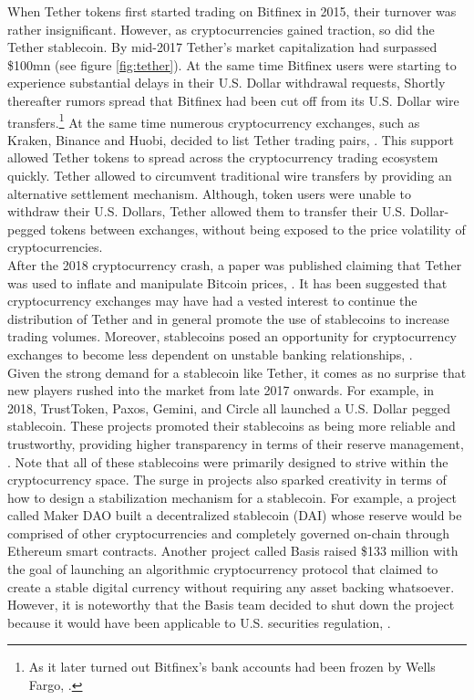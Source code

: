 \documentclass[conference]{IEEEtran}
\begin{document}
When Tether tokens first started trading on Bitfinex in 2015, their turnover was rather insignificant. However, as cryptocurrencies gained traction, so did the Tether stablecoin. By mid-2017 Tether's market capitalization had surpassed \$100mn (see figure \ref{fig:tether}). At the same time Bitfinex users were starting to experience substantial delays in their U.S. Dollar withdrawal requests, \cite{Bloomberg.} Shortly thereafter rumors spread that Bitfinex had been cut off from its U.S. Dollar wire transfers.\footnote{As it later turned out Bitfinex's bank accounts had been frozen by Wells Fargo, \cite{Buntinx}.} At the same time numerous cryptocurrency exchanges, such as Kraken, Binance and Huobi, decided to list Tether trading pairs, \cite{Kraken}\cite{Binance}\cite{Huobi}. This support allowed Tether tokens to spread across the cryptocurrency trading ecosystem quickly. Tether allowed to circumvent traditional wire transfers by providing an alternative settlement mechanism. Although, token users were unable to withdraw their U.S. Dollars, Tether allowed them to transfer their U.S. Dollar-pegged tokens between exchanges, without being exposed to the price volatility of cryptocurrencies.\\

After the 2018 cryptocurrency crash, a paper was published claiming that Tether was used to inflate and manipulate Bitcoin prices, \cite{Griffin}. It has been suggested that cryptocurrency exchanges may have had a vested interest to continue the distribution of Tether and in general promote the use of stablecoins to increase trading volumes. Moreover, stablecoins posed an opportunity for cryptocurrency exchanges to become less dependent on unstable banking relationships, \cite{Upson}.\\

Given the strong demand for a stablecoin like Tether, it comes as no surprise that new players rushed into the market from late 2017 onwards. For example, in 2018, TrustToken, Paxos, Gemini, and Circle all launched a U.S. Dollar pegged stablecoin. These projects promoted their stablecoins as being more reliable and trustworthy, providing higher transparency in terms of their reserve management, \cite{Gemini}\cite{Coinbase}\cite{Huobi2}. Note that all of these stablecoins were primarily designed to strive within the cryptocurrency space. The surge in projects also sparked creativity in terms of how to design a stabilization mechanism for a stablecoin. For example, a project called Maker DAO built a decentralized stablecoin (DAI) whose reserve would be comprised of other cryptocurrencies and completely governed on-chain through Ethereum smart contracts. Another project called Basis raised \$133 million with the goal of launching an algorithmic cryptocurrency protocol that claimed to create a stable digital currency without requiring any asset backing whatsoever. However, it is noteworthy that the Basis team decided to shut down the project because it would have been applicable to U.S. securities regulation, \cite{Basis}.\\
\end{document}
